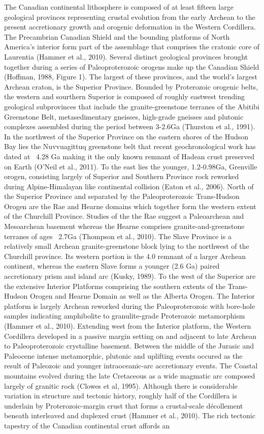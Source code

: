 \documentclass[review]{elsarticle}
\begin{document}
The Canadian continental lithosphere is composed of at least fifteen large geological provinces representing crustal evolution from the early Archean to the present accretionary growth and orogenic deformation in the Western Cordillera. The Precambrian Canadian Shield and the bounding platforms of North America's interior form part of the assemblage that comprises the cratonic core of Laurentia (Hammer et al., 2010). Several distinct geological provinces brought together during a series of Paleoproterozoic orogens make up the Canadian Shield (Hoffman, 1988, Figure 1). The largest of these provinces, and the world's largest Archean craton, is the Superior Province. Bounded by Proterozoic orogenic belts, the western and sourthern Superior is composed of roughly eastwest trending geological subprovinces that include the granite-greenstone terranes of the Abitibi Greenstone Belt, metasedimentary gneisses, high-grade gneisses and plutonic complexes assembled during the period between 3-2.6Ga (Thurston et al., 1991). In the northwest of the Superior Province on the eastern shores of the Hudson Bay lies the Nuvvuagittuq greenstone belt that recent geochronological work has dated at ~4.28 Ga making it the only known remnant of Hadean crust preserved on Earth (O'Neil et al., 2011). To the east lies the younger, 1.2-0.98Ga, Grenville orogen, consisting largely of Superior and Southern Province rock reworked during Alpine-Himalayan like continental collision (Eaton et al., 2006). North of the Superior Province and separated by the Paleoproterozoic Trans-Hudson Orogen are the Rae and Hearne domains which together form the western extent of the Churchill Province. Studies of the the Rae suggest a Paleoarchean and Mesoarchean basement whereas the Hearne comprises granite-and-greenstone terranes of ages ~2.7Ga (Thompson et al., 2010). The Slave Province is a relatively small Archean granite-greenstone block lying to the northwest of the Churchill province. Its western portion is the 4.0 remnant of a larger Archean continent, whereas the eastern Slave forms a younger (2.6 Ga) paired accretionary prism and island arc (Kusky, 1989). To the west of the Superior are the extensive Interior Platforms comprising the southern extents of the Trans-Hudson Orogen and Hearne Domain as well as the Alberta Orogen. The Interior platform is largely Archean reworked during the Paleoproterozoic with bore-hole samples indicating amphibolite to granulite-grade Proterozoic metamorphism (Hammer et al., 2010). Extending west from the Interior platform, the Western Cordillera developed in a passive margin setting on and adjacent to late Archean to Paleoproterozoic crystalline basement. Between the middle of the Jurasic and Paleocene intense metamorphic, plutonic and uplifting events occured as the result of Paleozoic and younger intraoceanic-arc accretionary events. The Coastal mountains evolved during the late Cretaceous as a wide magmatic arc composed largely of granitic rock (Clowes et al, 1995). Although there is considerable variation in structure and tectonic history, roughly half of the Cordillera is underlain by Proterozoic-margin crust that forms a crustal-scale décollement beneath interleaved and duplexed crust (Hammer et al., 2010). The rich tectonic tapestry of the Canadian continental crust affords an 
\end{document}
